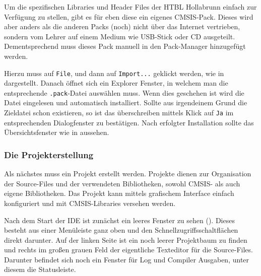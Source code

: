 
\label{sec:tut-firstproject2.1}
Um die spezifischen Libraries und Header Files der HTBL Hollabrunn einfach zur Verfügung zu stellen, gibt es für eben diese ein eigenes \gls{CMSIS}-Pack. Dieses wird aber anders als die anderen Packs (noch) nicht über das Internet vertrieben, sondern vom Lehrer auf einem Medium wie USB-Stick oder CD ausgeteilt. Dementsprechend muss dieses Pack manuell in den Pack-Manager hinzugefügt werden.


Hierzu muss auf \texttt{File}, und dann auf \texttt{Import...} geklickt werden, wie in  dargestellt. Danach öffnet sich ein Explorer Fenster, in welchem man die entsprechende \texttt{.pack}-Datei auswählen muss. Wenn dies geschehen ist wird die Datei eingelesen und automatisch installiert. Sollte aus irgendeinem Grund die Zieldatei schon existieren, so ist das überschreiben mittels Klick auf \texttt{Ja} im entsprechenden Dialogfenster zu bestätigen. Nach erfolgter Installation sollte das Übersichtsfenster wie in  aussehen.


\subsubsection{Die Projekterstellung}
\label{sec:tut-firstproject3}
Als nächstes muss ein \uVision{} Projekt erstellt werden. Projekte dienen zur Organisation der Source-Files und der verwendeten Bibliotheken, sowohl \gls{CMSIS}- als auch eigene Bibliotheken. Das Projekt kann mittels grafischem Interface einfach konfiguriert und mit \gls{CMSIS}-Libraries versehen werden.


Nach dem Start der \gls{IDE} ist zunächst ein leeres Fenster zu sehen (). Dieses besteht aus einer Menüleiste ganz oben und den Schnellzugriffsschaltflächen direkt darunter. Auf der linken Seite ist ein noch leerer Projektbaum zu finden und rechts im großen grauen Feld der eigentliche Texteditor für die Source-Files. Darunter befindet sich noch ein Fenster für Log und Compiler Ausgaben, unter diesem die Statusleiste.

